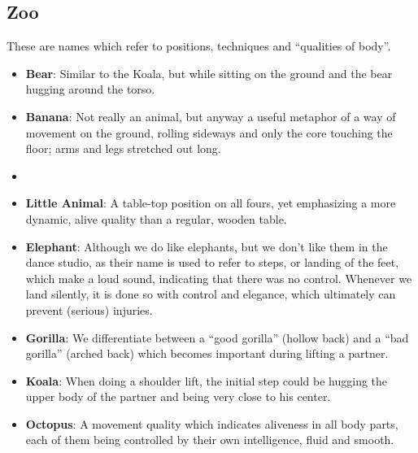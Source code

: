\subsection{Zoo}\label{subsec:zoo}

These are names which refer to positions, techniques and ``qualities of body''.

\begin{itemize}
    \item \textbf{Bear}: Similar to the Koala, but while sitting on the ground and the bear hugging around the torso.
    \item \textbf{Banana}: Not really an animal, but anyway a useful metaphor of a way of movement on the ground, rolling sideways and only the core touching the floor; arms and legs stretched out long.
    \item \item \textbf{Little Animal}: A table-top position on all fours, yet emphasizing a more dynamic, alive quality than a regular, wooden table.
    \item \textbf{Elephant}: Although we do like elephants, but we don't like them in the dance studio, as their name is used to refer to steps, or landing of the feet, which make a loud sound, indicating that there was no control.
    Whenever we land silently, it is done so with control and elegance, which ultimately can prevent (serious) injuries.
    \item \textbf{Gorilla}: We differentiate between a ``good gorilla'' (hollow back) and a ``bad gorilla'' (arched back) which becomes important during lifting a partner.
    \item \textbf{Koala}: When doing a shoulder lift, the initial step could be hugging the upper body of the partner and being very close to his center.
    \item \textbf{Octopus}: A movement quality which indicates aliveness in all body parts, each of them being controlled by their own intelligence, fluid and smooth.
\end{itemize}
